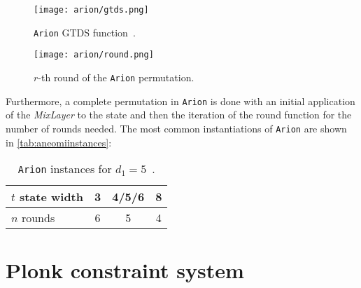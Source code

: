 \documentclass[12pt, a4paper]{report}
\begin{document}
\begin{figure}[H]
  \begin{center}
    \texttt{[image: arion/gtds.png]}
  \end{center}
  \caption{\texttt{Arion} GTDS function~\cite[Fig.~1.21]{bouvier}.}\label{fig:gtds}
\end{figure}

\begin{figure}[H]
  \begin{center}
    \texttt{[image: arion/round.png]}
  \end{center}
  \caption{$r$-th round of the \texttt{Arion} permutation.}\label{fig:arion}
\end{figure}

Furthermore, a complete permutation in \texttt{Arion} is done with an initial application of the \textit{MixLayer} to the state and then the iteration of the round function for the number of rounds needed.
The most common instantiations of \texttt{Arion} are shown in \autoref{tab:aneomiinstances}:
\begin{table}[H]
  \caption{\texttt{Arion} instances for $d_1 = 5$~\cite[Tab.~3]{arion}.}\label{tab:aneomiinstances}
  \begin{center}
    \begin{tabular}{|l|c|c|c|}
      \hline
      $t$ state width & 3 & 4/5/6 & 8 \\
      \hline
      $n$ rounds & 6 & 5 & 4 \\
      \hline
    \end{tabular}
  \end{center}
\end{table}

\section{\textsf{Plonk} constraint system}\label{sec:plonk}
\end{document}
